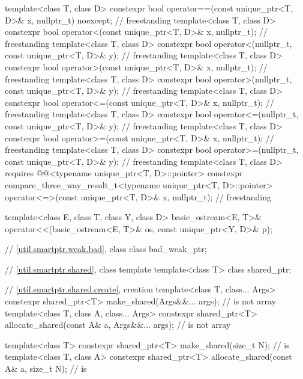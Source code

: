 \begin{codeblock}
{  template<class T, class D>
    constexpr bool operator==(const unique_ptr<T, D>& x, nullptr_t) noexcept;       // freestanding
  template<class T, class D>
    constexpr bool operator<(const unique_ptr<T, D>& x, nullptr_t);                 // freestanding
  template<class T, class D>
    constexpr bool operator<(nullptr_t, const unique_ptr<T, D>& y);                 // freestanding
  template<class T, class D>
    constexpr bool operator>(const unique_ptr<T, D>& x, nullptr_t);                 // freestanding
  template<class T, class D>
    constexpr bool operator>(nullptr_t, const unique_ptr<T, D>& y);                 // freestanding
  template<class T, class D>
    constexpr bool operator<=(const unique_ptr<T, D>& x, nullptr_t);                // freestanding
  template<class T, class D>
    constexpr bool operator<=(nullptr_t, const unique_ptr<T, D>& y);                // freestanding
  template<class T, class D>
    constexpr bool operator>=(const unique_ptr<T, D>& x, nullptr_t);                // freestanding
  template<class T, class D>
    constexpr bool operator>=(nullptr_t, const unique_ptr<T, D>& y);                // freestanding
  template<class T, class D>
    requires @@<typename unique_ptr<T, D>::pointer>
    constexpr compare_three_way_result_t<typename unique_ptr<T, D>::pointer>
      operator<=>(const unique_ptr<T, D>& x, nullptr_t);                            // freestanding

  template<class E, class T, class Y, class D>
    basic_ostream<E, T>& operator<<(basic_ostream<E, T>& os, const unique_ptr<Y, D>& p);

  // \ref{util.smartptr.weak.bad}, class 
  class bad_weak_ptr;

  // \ref{util.smartptr.shared}, class template 
  template<class T> class shared_ptr;

  // \ref{util.smartptr.shared.create},  creation
  template<class T, class... Args>
    constexpr shared_ptr<T> make_shared(Args&&... args);                        //  is not array
  template<class T, class A, class... Args>
    constexpr shared_ptr<T> allocate_shared(const A& a, Args&&... args);        //  is not array

  template<class T>
    constexpr shared_ptr<T> make_shared(size_t N);                                  //  is 
  template<class T, class A>
    constexpr shared_ptr<T> allocate_shared(const A& a, size_t N);                  //  is 

}
\end{codeblock}
